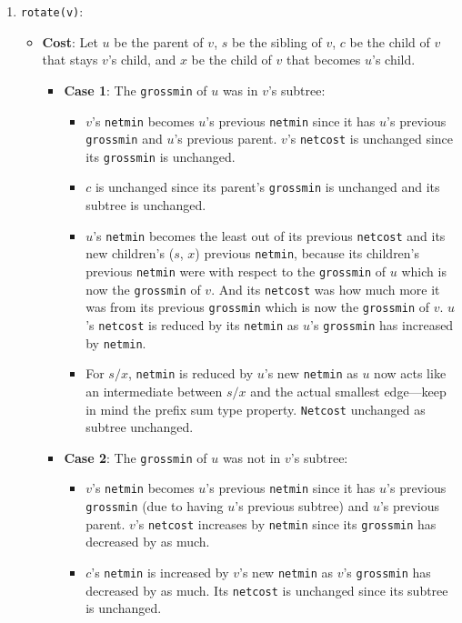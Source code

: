 \documentclass[a4paper, 11pt]{article}
\begin{document}
\begin{enumerate}
\item \texttt{rotate(v)}:
\begin{itemize}
    \item \textbf{Cost}: Let \(u\) be the parent of \(v\), \(s\) be the sibling of \(v\), \(c\) be the child of \(v\) that stays \(v\)’s child, and \(x\) be the child of \(v\) that becomes \(u\)’s child.
    \begin{itemize}
        \item \textbf{Case 1}: The \texttt{grossmin} of \(u\) was in \(v\)’s subtree:
        \begin{itemize}
            \item \(v\)’s \texttt{netmin} becomes \(u\)’s previous \texttt{netmin} since it has \(u\)’s previous \texttt{grossmin} and \(u\)’s previous parent. \(v\)’s \texttt{netcost} is unchanged since its \texttt{grossmin} is unchanged.
            \item \(c\) is unchanged since its parent’s \texttt{grossmin} is unchanged and its subtree is unchanged.
            \item \(u\)’s \texttt{netmin} becomes the least out of its previous \texttt{netcost} and its new children’s (\(s\), \(x\)) previous \texttt{netmin}, because its children’s previous \texttt{netmin} were with respect to the \texttt{grossmin} of \(u\) which is now the \texttt{grossmin} of \(v\). And its \texttt{netcost} was how much more it was from its previous \texttt{grossmin} which is now the \texttt{grossmin} of \(v\). \(u\)’s \texttt{netcost} is reduced by its \texttt{netmin} as \(u\)’s \texttt{grossmin} has increased by \texttt{netmin}.
            \item For \(s/x\), \texttt{netmin} is reduced by \(u\)’s new \texttt{netmin} as \(u\) now acts like an intermediate between \(s/x\) and the actual smallest edge—keep in mind the prefix sum type property. \texttt{Netcost} unchanged as subtree unchanged.
        \end{itemize}
        \item \textbf{Case 2}: The \texttt{grossmin} of \(u\) was not in \(v\)’s subtree:
        \begin{itemize}
            \item \(v\)’s \texttt{netmin} becomes \(u\)’s previous \texttt{netmin} since it has \(u\)’s previous \texttt{grossmin} (due to having \(u\)’s previous subtree) and \(u\)’s previous parent. \(v\)’s \texttt{netcost} increases by \texttt{netmin} since its \texttt{grossmin} has decreased by as much.
            \item \(c\)’s \texttt{netmin} is increased by \(v\)’s new \texttt{netmin} as \(v\)’s \texttt{grossmin} has decreased by as much. Its \texttt{netcost} is unchanged since its subtree is unchanged.

\end{itemize}
\end{itemize}
\end{itemize}
\end{enumerate}
\end{document}
